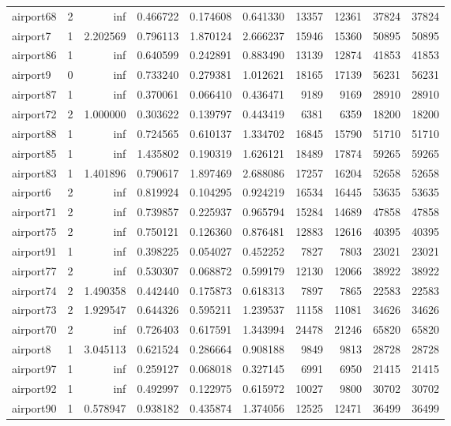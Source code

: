 \begin{longtable}{|l|r|r|r|r|r|r|r|r|r|}
airport68 & 2 & inf & 0.466722 & 0.174608 & 0.641330 & 13357 & 12361 & 37824 & 37824 \\
airport7 & 1 & 2.202569 & 0.796113 & 1.870124 & 2.666237 & 15946 & 15360 & 50895 & 50895 \\
airport86 & 1 & inf & 0.640599 & 0.242891 & 0.883490 & 13139 & 12874 & 41853 & 41853 \\
airport9 & 0 & inf & 0.733240 & 0.279381 & 1.012621 & 18165 & 17139 & 56231 & 56231 \\
airport87 & 1 & inf & 0.370061 & 0.066410 & 0.436471 & 9189 & 9169 & 28910 & 28910 \\
airport72 & 2 & 1.000000 & 0.303622 & 0.139797 & 0.443419 & 6381 & 6359 & 18200 & 18200 \\
airport88 & 1 & inf & 0.724565 & 0.610137 & 1.334702 & 16845 & 15790 & 51710 & 51710 \\
airport85 & 1 & inf & 1.435802 & 0.190319 & 1.626121 & 18489 & 17874 & 59265 & 59265 \\
airport83 & 1 & 1.401896 & 0.790617 & 1.897469 & 2.688086 & 17257 & 16204 & 52658 & 52658 \\
airport6 & 2 & inf & 0.819924 & 0.104295 & 0.924219 & 16534 & 16445 & 53635 & 53635 \\
airport71 & 2 & inf & 0.739857 & 0.225937 & 0.965794 & 15284 & 14689 & 47858 & 47858 \\
airport75 & 2 & inf & 0.750121 & 0.126360 & 0.876481 & 12883 & 12616 & 40395 & 40395 \\
airport91 & 1 & inf & 0.398225 & 0.054027 & 0.452252 & 7827 & 7803 & 23021 & 23021 \\
airport77 & 2 & inf & 0.530307 & 0.068872 & 0.599179 & 12130 & 12066 & 38922 & 38922 \\
airport74 & 2 & 1.490358 & 0.442440 & 0.175873 & 0.618313 & 7897 & 7865 & 22583 & 22583 \\
airport73 & 2 & 1.929547 & 0.644326 & 0.595211 & 1.239537 & 11158 & 11081 & 34626 & 34626 \\
airport70 & 2 & inf & 0.726403 & 0.617591 & 1.343994 & 24478 & 21246 & 65820 & 65820 \\
airport8 & 1 & 3.045113 & 0.621524 & 0.286664 & 0.908188 & 9849 & 9813 & 28728 & 28728 \\
airport97 & 1 & inf & 0.259127 & 0.068018 & 0.327145 & 6991 & 6950 & 21415 & 21415 \\
airport92 & 1 & inf & 0.492997 & 0.122975 & 0.615972 & 10027 & 9800 & 30702 & 30702 \\
airport90 & 1 & 0.578947 & 0.938182 & 0.435874 & 1.374056 & 12525 & 12471 & 36499 & 36499 \\

\end{longtable}
